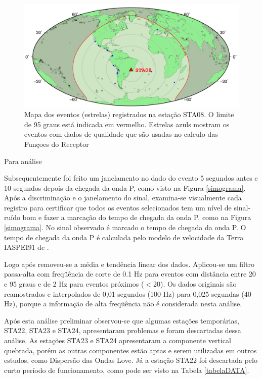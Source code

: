 \begin{figure}[!ht]
\centering
\includegraphics[scale=0.6]{Figs/mapa_de_eventos.png}
\caption[Mapa dos eventos registrados na estação STA08.]{Mapa dos eventos (estrelas) registrados na estação STA08. O limite de 95 graus está indicada em vermelho. Estrelas azuls mostram os eventos com dados de qualidade que são usadas no calculo das Funçoes do Receptor}
\label{mapa_eventos}
\end{figure}

Para análise 

Subsequentemente foi feito um janelamento no dado do evento 5 segundos antes e 10 segundos depois da chegada da onda P, como visto na Figura \ref{simograma}. Após a discriminação e o janelamento do sinal, examina-se visualmente cada registro para certificar que todos os eventos selecionados tem um nível de sinal-ruído bom e fazer a marcação do tempo de chegada da onda P, como na Figura \ref{simograma}. No sinal observado é marcado o tempo de chegada da onda P. O tempo de chegada da onda P é calculada pelo modelo de velocidade da Terra IASPEI91 de \cite{kennet_iaspei_1991}.

Logo após removeu-se a média e tendência linear dos dados. Aplicou-se um filtro passa-alta com freqüência de corte de 0.1 Hz para eventos com distância entre 20 e 95 graus e de 2 Hz para eventos próximos ($<$20). Os dados originais são reamostrados e interpolados de 0,01 segundos (100 Hz) para 0,025 segundas (40 Hz), porque a informação de alta freqüência não é considerada nesta análise.

Após esta análise preliminar observou-se que algumas estações temporárias, STA22, STA23 e STA24, apresentaram problemas e foram descartadas dessa análise. As estações STA23 e STA24 apresentaram a componente vertical quebrada, porém as outras componentes estão aptas e serem utilizadas em outros estudos, como Dispersão das Ondas Love. Já a estação STA22 foi descartada pelo curto período de funcionamento, como pode ser visto na Tabela \ref{tabelaDATA}.


